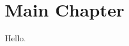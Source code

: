 \documentclass[\main/thesis.tex]{subfiles}
\begin{document}
\chapter{Main Chapter}

Hello.
\end{document}

